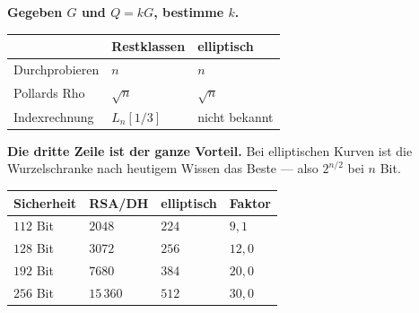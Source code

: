 \begin{merksatz}
\begin{center}
\begin{minipage}{0.9\textwidth}
\textbf{Gegeben $G$ und $Q = kG$, bestimme $k$.}
\end{minipage}
\end{center}

\begin{center}
{\small
\renewcommand{\arraystretch}{1.5}
\begin{tabular}{@{}P{2.8cm}P{2.4cm}P{2.8cm}@{}}
\toprule
& \textbf{Restklassen} & \textbf{elliptisch}\\
\midrule
Durchprobieren & $n$ & $n$\\
Pollards Rho & $\sqrt n$ & $\sqrt n$\\
Indexrechnung & \textcolor{akzent}{$L_n[1/3]$} & \textcolor{gruen}{nicht bekannt}\\
\bottomrule
\end{tabular}}
\end{center}

\begin{center}
\begin{minipage}{0.9\textwidth}
\textbf{Die dritte Zeile ist der ganze Vorteil.} Bei elliptischen Kurven ist die Wurzelschranke nach heutigem Wissen das Beste --- also $2^{n/2}$ bei $n$ Bit.
\end{minipage}
\end{center}

\begin{center}
{\small
\renewcommand{\arraystretch}{1.48}
\begin{tabular}{@{}P{2.0cm}P{2.2cm}P{2.0cm}P{1.8cm}@{}}
\toprule
\textbf{Sicherheit} & \textbf{RSA/DH} & \textbf{elliptisch} & \textbf{Faktor}\\
\midrule
$112$ Bit & $2048$ & $224$ & $9{,}1$\\
$128$ Bit & $3072$ & $256$ & $12{,}0$\\
$192$ Bit & $7680$ & $384$ & $20{,}0$\\
$256$ Bit & $15\,360$ & $512$ & $30{,}0$\\
\bottomrule
\end{tabular}}
\end{center}

\begin{center}
\begin{minipage}{0.88\textwidth}
\end{minipage}
\end{center}
\end{merksatz}

